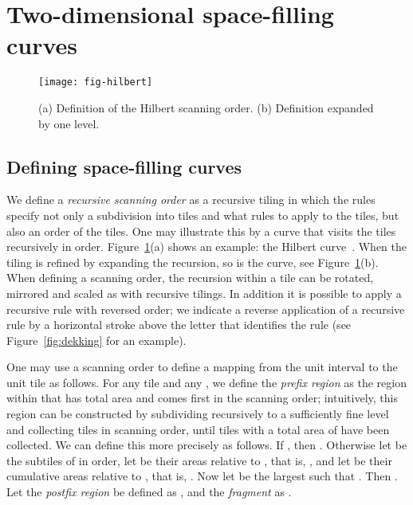 \documentclass[11pt,a4paper]{article}
\begin{document}
\section{Two-dimensional space-filling curves}
\label{sec:2DSFC}

\begin{figure}
\centering
\texttt{[image: fig-hilbert]}
\caption{(a) Definition of the Hilbert scanning order. (b) Definition expanded by one level.}
\label{fig:hilbert}
\end{figure}

\subsection{Defining space-filling curves}
\label{sec:2DSFC-definition}
We define a \emph{recursive scanning order} as a recursive tiling in which the rules specify not only a subdivision into tiles and what rules to apply to the tiles, but also an order of the tiles. One may illustrate this by a curve that visits the tiles recursively in order. Figure~\ref{fig:hilbert}(a) shows an example: the Hilbert curve~\cite{Hilbert1891}. When the tiling is refined by expanding the recursion, so is the curve, see Figure~\ref{fig:hilbert}(b). When defining a scanning order, the recursion within a tile can be rotated, mirrored and scaled as with recursive tilings. In addition it is possible to apply a recursive rule with reversed order; we indicate a reverse application of a recursive rule by a horizontal stroke above the letter that identifies the rule (see Figure~\ref{fig:dekking} for an example).

One may use a scanning order to define a mapping from the unit interval to the unit tile as follows. For any tile  and any , we define the \emph{prefix region}  as the region within  that has total area  and comes first in the scanning order; intuitively, this region can be constructed by subdividing  recursively to a sufficiently fine level and collecting tiles in scanning order, until tiles with a total area of  have been collected. We can define this more precisely as follows. If , then . Otherwise let  be the subtiles of  in order, let  be their areas relative to , that is, , and let  be their cumulative areas relative to , that is, . Now let  be the largest  such that . Then . Let the \emph{postfix region}  be defined as , and the \emph{fragment}  as .
\end{document}

